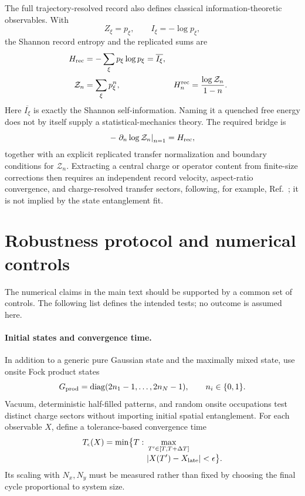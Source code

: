 The full trajectory-resolved record also defines classical information-theoretic
observables.  With
\begin{equation}
    Z_\xi=p_\xi,
    \qquad
    I_\xi=-\log p_\xi,
    \label{eq:app-record-self-information}
\end{equation}
the Shannon record entropy and the replicated sums are
\begin{align}
    H_{\rm rec}&=-\sum_\xi p_\xi\log p_\xi
    =\overline{I_\xi},\nonumber\\
    \mathcal Z_n&=\sum_\xi p_\xi^n,
    &H_n^{\rm rec}&=\frac{\log\mathcal Z_n}{1-n}.
    \label{eq:app-record-Renyi}
\end{align}
Here \(\overline{I_\xi}\) is exactly the Shannon self-information.  Naming it
a quenched free energy does not by itself supply a statistical-mechanics
theory.  The required bridge is
\begin{equation}
    -\left.\partial_n\log\mathcal Z_n\right|_{n=1}=H_{\rm rec},
    \label{eq:app-record-replica-derivative}
\end{equation}
together with an explicit replicated transfer normalization and boundary
conditions for \(\mathcal Z_n\).  Extracting a central charge or operator
content from finite-size corrections then requires an independent record
velocity, aspect-ratio convergence, and charge-resolved transfer sectors,
following, for example, Ref.~\cite{Zabalo2022}; it is not implied by the
state entanglement fit.


\section{Robustness protocol and numerical controls}
\label{app:robustness}

The numerical claims in the main text should be supported by a common set of
controls.  The following list defines the intended tests; no outcome is
assumed here.

\paragraph*{Initial states and convergence time.}
In addition to a generic pure Gaussian state and the maximally mixed state,
use onsite Fock product states
\begin{equation}
    G_{\rm prod}=\operatorname{diag}(2n_1-1,\ldots,2n_N-1),
    \qquad n_i\in\{0,1\}.
    \label{eq:app-product-initial-covariance}
\end{equation}
Vacuum, deterministic half-filled patterns, and random onsite occupations
test distinct charge sectors without importing initial spatial entanglement.
For each observable \(X\), define a tolerance-based convergence time
\begin{equation}
    \begin{aligned}
    T_\epsilon(X)=\min\bigl\{T:\ &
      \max_{T'\in[T,T+\Delta T]}\\[-0.25em]
      &|X(T')-X_{\rm late}|<\epsilon\bigr\}.
    \end{aligned}
    \label{eq:app-convergence-time}
\end{equation}
Its scaling with \(N_x,N_y\) must be measured rather than fixed by choosing
the final cycle proportional to system size.

